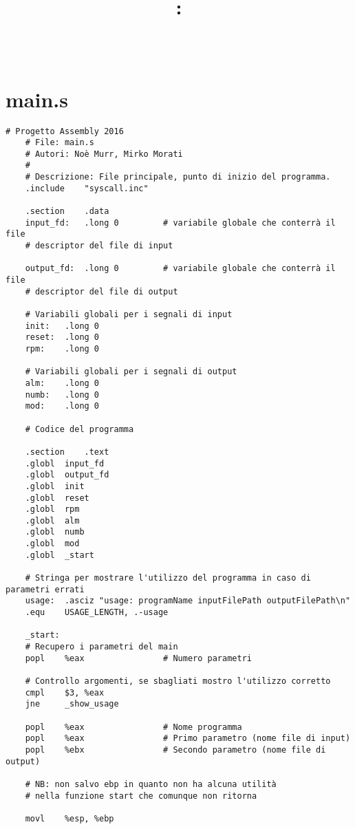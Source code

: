 \documentclass[a4paper,11pt]{article}
\title{
	\vspace{2in}
	\textmd{\textbf{\hmwkClass:\\ \hmwkTitle}}\\
	\vspace{0.1in}\large{\textit{\hmwkAuthorName}}
	\vspace{3in}
}
\begin{document}
	\clearpage
	\maketitle
	\thispagestyle{empty}
	\newpage
	\tableofcontents
	\newpage
	
	\section{main.s}
%	
	\begin{lstlisting}[language=MyAssembler, style=MyAsm]
	# Progetto Assembly 2016
	# File: main.s
	# Autori: Noè Murr, Mirko Morati
	#
	# Descrizione: File principale, punto di inizio del programma.
	.include    "syscall.inc"
	
	.section    .data
	input_fd:   .long 0         # variabile globale che conterrà il file
	# descriptor del file di input
	
	output_fd:  .long 0         # variabile globale che conterrà il file
	# descriptor del file di output
	
	# Variabili globali per i segnali di input
	init:   .long 0
	reset:  .long 0
	rpm:    .long 0
	
	# Variabili globali per i segnali di output
	alm:    .long 0
	numb:   .long 0
	mod:    .long 0
	
	# Codice del programma
	
	.section    .text
	.globl  input_fd
	.globl  output_fd
	.globl  init
	.globl  reset
	.globl  rpm
	.globl  alm
	.globl  numb
	.globl  mod
	.globl  _start
	
	# Stringa per mostrare l'utilizzo del programma in caso di parametri errati
	usage:  .asciz "usage: programName inputFilePath outputFilePath\n"
	.equ    USAGE_LENGTH, .-usage
	
	_start:
	# Recupero i parametri del main
	popl    %eax                # Numero parametri
	
	# Controllo argomenti, se sbagliati mostro l'utilizzo corretto
	cmpl    $3, %eax
	jne     _show_usage
	
	popl    %eax                # Nome programma
	popl    %eax                # Primo parametro (nome file di input)
	popl    %ebx                # Secondo parametro (nome file di output)
	
	# NB: non salvo ebp in quanto non ha alcuna utilità
	# nella funzione start che comunque non ritorna
	
	movl    %esp, %ebp
	

\end{lstlisting}
\end{document}
